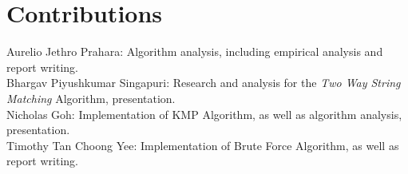 \section*{Contributions}
\thispagestyle{empty}

Aurelio Jethro Prahara: Algorithm analysis, including empirical analysis and report writing. \\

\noindent
Bhargav Piyushkumar Singapuri: Research and analysis for the \emph{Two Way String Matching} Algorithm, presentation. \\

\noindent
Nicholas Goh: Implementation of KMP Algorithm, as well as algorithm analysis, presentation. \\

\noindent
Timothy Tan Choong Yee: Implementation of Brute Force Algorithm, as well as report writing. 